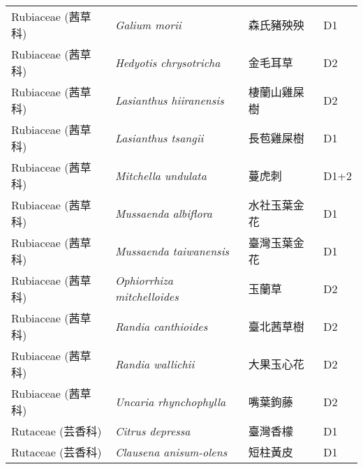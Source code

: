 \begin{longtable}{p{3cm}p{5cm}p{3cm}p{4cm}}
    Rubiaceae (茜草科) & \textit{Galium morii}  & 森氏豬殃殃 & D1 \index{Galium@\textit{Galium}!morii@\textit{morii}}  \index{森氏豬殃殃} \\
    Rubiaceae (茜草科) & \textit{Hedyotis chrysotricha}  & 金毛耳草 & D2 \index{Hedyotis@\textit{Hedyotis}!chrysotricha@\textit{chrysotricha}}  \index{金毛耳草} \\
    Rubiaceae (茜草科) & \textit{Lasianthus hiiranensis}  & 棲蘭山雞屎樹 & D2 \index{Lasianthus@\textit{Lasianthus}!hiiranensis@\textit{hiiranensis}}  \index{棲蘭山雞屎樹} \\
    Rubiaceae (茜草科) & \textit{Lasianthus tsangii}  & 長苞雞屎樹 & D1 \index{Lasianthus@\textit{Lasianthus}!tsangii@\textit{tsangii}}  \index{長苞雞屎樹} \\
    Rubiaceae (茜草科) & \textit{Mitchella undulata}  & 蔓虎刺 & D1+2 \index{Mitchella@\textit{Mitchella}!undulata@\textit{undulata}}  \index{蔓虎刺} \\
    Rubiaceae (茜草科) & \textit{Mussaenda albiflora}  & 水社玉葉金花 & D1 \index{Mussaenda@\textit{Mussaenda}!albiflora@\textit{albiflora}}  \index{水社玉葉金花} \\
    Rubiaceae (茜草科) & \textit{Mussaenda taiwanensis}  & 臺灣玉葉金花 & D1 \index{Mussaenda@\textit{Mussaenda}!taiwanensis@\textit{taiwanensis}}  \index{臺灣玉葉金花} \\
    Rubiaceae (茜草科) & \textit{Ophiorrhiza mitchelloides}  & 玉蘭草 & D2 \index{Ophiorrhiza@\textit{Ophiorrhiza}!mitchelloides@\textit{mitchelloides}}  \index{玉蘭草} \\
    Rubiaceae (茜草科) & \textit{Randia canthioides}  & 臺北茜草樹 & D2 \index{Randia@\textit{Randia}!canthioides@\textit{canthioides}}  \index{臺北茜草樹} \\
    Rubiaceae (茜草科) & \textit{Randia wallichii}  & 大果玉心花 & D2 \index{Randia@\textit{Randia}!wallichii@\textit{wallichii}}  \index{大果玉心花} \\
    Rubiaceae (茜草科) & \textit{Uncaria rhynchophylla}  & 嘴葉鉤藤 & D2 \index{Uncaria@\textit{Uncaria}!rhynchophylla@\textit{rhynchophylla}}  \index{嘴葉鉤藤} \\
    Rutaceae (芸香科) & \textit{Citrus depressa}  & 臺灣香檬 & D1 \index{Citrus@\textit{Citrus}!depressa@\textit{depressa}}  \index{臺灣香檬} \\
    Rutaceae (芸香科) & \textit{Clausena anisum-olens}  & 短柱黃皮 & D1 \index{Clausena@\textit{Clausena}!anisum-olens@\textit{anisum-olens}}  \index{短柱黃皮} \\

\end{longtable}
